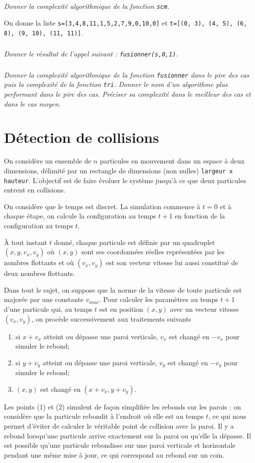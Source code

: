 \documentclass[10pt,fleqn]{article} %
\begin{document}
\subparagraph{}
\textit{Donner la complexité algorithmique de la fonction \texttt{scm}.}

\vspace{.5cm}
On donne la liste \texttt{s=[3,4,8,11,1,5,2,7,9,0,10,0]} et \texttt{t=[(0, 3), (4, 5), (6, 8), (9, 10), (11, 11)]}.
\subparagraph{}
\textit{Donner le résultat de l'appel suivant :  \texttt{fusionner(s,0,1)}.}


\subparagraph{}
\textit{Donner la complexité algorithmique de la fonction \texttt{fusionner} dans le pire des cas puis la complexité de la fonction \texttt{tri}.
Donner le nom d'un algorithme plus performant dans le pire des cas. Préciser sa complexité dans le meilleur des cas et dans le cas moyen.}






\section*{Détection de collisions}

On considère un ensemble de $n$ particules en mouvement dans un espace à deux dimensions, délimité par un rectangle de dimensions (non nulles) \texttt{largeur x hauteur}. L'objectif est de faire évoluer le système jusqu'à ce que deux particules entrent en collisions.

On considère que le temps est discret. La simulation commence à $t=0$ et à chaque étape, on calcule la configuration au temps $t+1$ en fonction de la configuration au temps $t$. 

À tout instant $t$ donné, chaque particule est définie par un quadruplet $(x,y,v_x,v_y)$ où $(x,y)$ sont ses coordonnées réelles représentées par les nombres flottants et où $(v_x,v_y)$ est son vecteur vitesse lui aussi constitué de deux nombres flottants. 

Dans tout le sujet, on suppose que la norme de la vitesse de toute particule est majorée par une constante $v_{max}$. Pour calculer les paramètres au temps $t+1$ d'une particule qui, au temps $t$ est en position $(x,y)$ avec un vecteur vitesse $(v_x,v_y)$, on procède successivement aux traitements suivants %
\begin{enumerate}
\item si $x+v_x$ atteint ou dépasse une paroi verticale, $v_x$ est changé en $-v_x$ pour simuler le rebond;
\item si $y+v_y$ atteint ou dépasse une paroi verticale, $v_y$ est changé en $-v_y$ pour simuler le rebond;
\item $(x,y)$ est changé en $(x+v_x,y+v_y)$. 
\end{enumerate}
Les points (1) et (2) simulent de façon simplifiée les rebonds sur les parois : on considère que la particule rebondit à l'endroit où elle est au temps $t$, ce qui nous permet d'éviter de calculer le véritable point de collision avec la paroi. Il y a rebond lorsqu'une particule arrive exactement sur la paroi ou qu'elle la dépasse. Il est possible qu'une particule rebondisse sur une paroi verticale et horizontale pendant une même mise à jour, ce qui correspond au rebond sur un coin.
\end{document}
